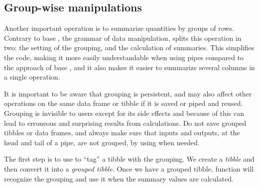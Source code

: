 \documentclass[krantz2]{krantz}\usepackage{knitr}
\begin{document}
\subsection{Group-wise manipulations}\label{sec:dplyr:group:wise}

Another important operation is to summarize quantities by groups of rows. Contrary to base \Rlang, the grammar of data manipulation, splits this operation in two: the setting of the grouping, and the calculation of summaries. This simplifies the code, making it more easily understandable when using pipes compared to the approach of base \Rlang {}, and it also makes it easier to summarize several columns in a single operation.

\begin{warningbox}
It is important to be aware that grouping is persistent, and may also affect other operations on the same data frame or tibble if it is saved or piped and reused. Grouping is invisible to users except for its side effects and because of this can lead to erroneous and surprising results from calculations. Do not save grouped tibbles or data frames, and always make sure that inputs and outputs, at the head and tail of a pipe, are not grouped, by using  when needed.
\end{warningbox}

The first step is to use  to ``tag'' a tibble with the grouping. We create a \emph{tibble} and then convert it into a \emph{grouped tibble}. Once we have a grouped tibble, function  will recognize the grouping and use it when the summary values are calculated.

\begin{knitrout}\footnotesize
{}\color{fgcolor}
\end{knitrout}
\end{document}
